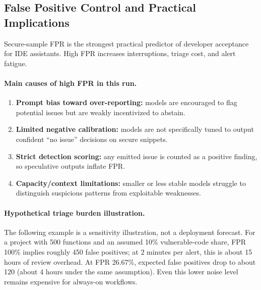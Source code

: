 \subsection{False Positive Control and Practical Implications}
\label{sec:eval-fpr-discussion}

Secure-sample FPR is the strongest practical predictor of developer acceptance for IDE assistants. High FPR increases interruptions, triage cost, and alert fatigue.

\paragraph{Main causes of high FPR in this run.}
\begin{enumerate}
  \item \textbf{Prompt bias toward over-reporting:} models are encouraged to flag potential issues but are weakly incentivized to abstain.
  \item \textbf{Limited negative calibration:} models are not specifically tuned to output confident ``no issue'' decisions on secure snippets.
  \item \textbf{Strict detection scoring:} any emitted issue is counted as a positive finding, so speculative outputs inflate FPR.
  \item \textbf{Capacity/context limitations:} smaller or less stable models struggle to distinguish suspicious patterns from exploitable weaknesses.
\end{enumerate}

\paragraph{Hypothetical triage burden illustration.}
The following example is a sensitivity illustration, not a deployment forecast. For a project with 500 functions and an assumed 10\% vulnerable-code share, FPR 100\% implies roughly 450 false positives; at 2 minutes per alert, this is about 15 hours of review overhead. At FPR 26.67\%, expected false positives drop to about 120 (about 4 hours under the same assumption). Even this lower noise level remains expensive for always-on workflows.

